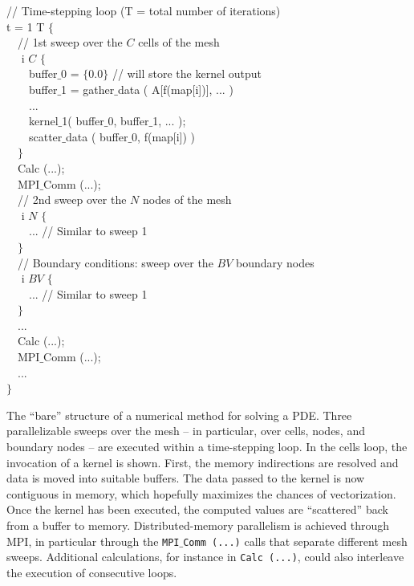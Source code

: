 \begin{algorithm}[t]
\scriptsize\ttfamily
{}

// Time-stepping loop (T = total number of iterations)\\
 t = 1  T $\lbrace$\\
~~// 1st sweep over the $C$ cells of the mesh\\
~~ i  $C$ $\lbrace$\\
~~~~buffer$\_$0 = $\lbrace 0.0 \rbrace$  // will store the kernel output\\
~~~~buffer$\_$1 = gather$\_$data ( A[f(map[i])], ... )\\
~~~~...\\
~~~~kernel$\_$1( buffer$\_$0, buffer$\_$1, ... );\\
~~~~scatter$\_$data ( buffer$\_$0, f(map[i]) )\\
~~$\rbrace$\\
~~Calc (...);\\
~~MPI$\_$Comm (...); \\
~~// 2nd sweep over the $N$ nodes of the mesh\\
~~ i  $N$ $\lbrace$\\
~~~~... // Similar to sweep 1 \\
~~$\rbrace$\\
~~// Boundary conditions: sweep over the $BV$ boundary nodes\\
~~ i  $BV$ $\lbrace$\\
~~~~... // Similar to sweep 1 \\
~~$\rbrace$\\
~~...\\
~~Calc (...);\\
~~MPI$\_$Comm (...); \\
~~...\\
$\rbrace$
\caption{The ``bare'' structure of a numerical method for solving a PDE. Three parallelizable sweeps over the mesh -- in particular, over cells, nodes, and boundary nodes -- are executed within a time-stepping loop. In the cells loop, the invocation of a kernel is shown. First, the memory indirections are resolved and data is moved into suitable buffers. The data passed to the kernel is now contiguous in memory, which hopefully maximizes the chances of vectorization. Once the kernel has been executed, the computed values are ``scattered'' back from a buffer to memory. Distributed-memory parallelism is achieved through MPI, in particular through the {\tt MPI$\_$Comm (...)} calls that separate different mesh sweeps. Additional calculations, for instance in {\tt Calc (...)}, could also interleave the execution of consecutive loops.}
\label{code:tiling-struct}
\end{algorithm}


